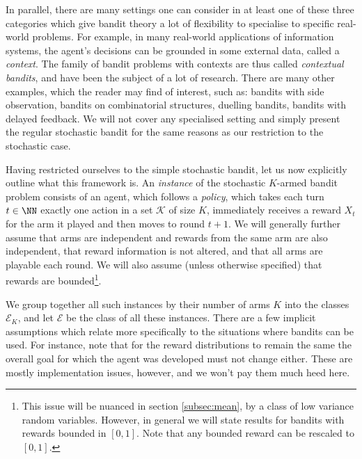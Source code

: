 \par In parallel, there are many settings one can consider in at least one of these three categories which give bandit theory a lot of flexibility to specialise to specific real-world problems. For example, in many real-world applications of information systems, the agent's decisions can be grounded in some external data, called a {\em context}. The family of bandit problems with contexts are thus called {\em contextual bandits}, and have been the subject of a lot of research\cite{banditalgs:11}. There are many other examples, which the reader may find of interest, such as: bandits with side observation\cite{mannor:2011}, bandits on combinatorial structures\cite{kveton:2014}, duelling bandits\cite{yue:2009}, bandits with delayed feedback\cite{dudik:2011}. We will not cover any specialised setting and simply present the regular stochastic bandit for the same reasons as our restriction to the stochastic case. 

\par Having restricted ourselves to the simple stochastic bandit, let us now explicitly outline what this framework is. An {\em instance} of the stochastic $K$-armed bandit problem consists of an agent, which follows a {\em policy}, which takes each turn $t\in\NN$ exactly one action in a set $\mathcal{K}$ of size $K$, immediately receives a reward $X_t$ for the arm it played and then moves to round $t+1$. We will generally further assume that arms are independent and rewards from the same arm are also independent, that reward information is not altered, and that all arms are playable each round. We will also assume (unless otherwise specified) that rewards are bounded\footnote{This issue will be nuanced in section \ref{subsec:mean}, by a class of low variance random variables. However, in general we will state results for bandits with rewards bounded in $[0,1]$. Note that any bounded reward can be rescaled to $[0,1]$.}.

\par We group together all such instances by their number of arms $K$ into the classes $\mathcal{E}_K$, and let $\mathcal{E}$ be the class of all these instances. There are a few implicit assumptions which relate more specifically to the situations where bandits can be used. For instance, note that for the reward distributions to remain the same the overall goal for which the agent was developed must not change either. These are mostly implementation issues, however, and we won't pay them much heed here. 

